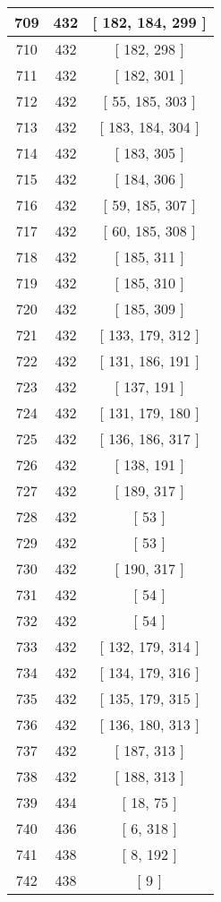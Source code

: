 \begin{center}
\begin{longtable}[H]{|| c c c ||}
\hline
709 & 432 & [ 182, 184, 299 ] \\ 
\hline
710 & 432 & [ 182, 298 ] \\ 
\hline
711 & 432 & [ 182, 301 ] \\ 
\hline
712 & 432 & [ 55, 185, 303 ] \\ 
\hline
713 & 432 & [ 183, 184, 304 ] \\ 
\hline
714 & 432 & [ 183, 305 ] \\ 
\hline
715 & 432 & [ 184, 306 ] \\ 
\hline
716 & 432 & [ 59, 185, 307 ] \\ 
\hline
717 & 432 & [ 60, 185, 308 ] \\ 
\hline
718 & 432 & [ 185, 311 ] \\ 
\hline
719 & 432 & [ 185, 310 ] \\ 
\hline
720 & 432 & [ 185, 309 ] \\ 
\hline
721 & 432 & [ 133, 179, 312 ] \\ 
\hline
722 & 432 & [ 131, 186, 191 ] \\ 
\hline
723 & 432 & [ 137, 191 ] \\ 
\hline
724 & 432 & [ 131, 179, 180 ] \\ 
\hline
725 & 432 & [ 136, 186, 317 ] \\ 
\hline
726 & 432 & [ 138, 191 ] \\ 
\hline
727 & 432 & [ 189, 317 ] \\ 
\hline
728 & 432 & [ 53 ] \\ 
\hline
729 & 432 & [ 53 ] \\ 
\hline
730 & 432 & [ 190, 317 ] \\ 
\hline
731 & 432 & [ 54 ] \\ 
\hline
732 & 432 & [ 54 ] \\ 
\hline
733 & 432 & [ 132, 179, 314 ] \\ 
\hline
734 & 432 & [ 134, 179, 316 ] \\ 
\hline
735 & 432 & [ 135, 179, 315 ] \\ 
\hline
736 & 432 & [ 136, 180, 313 ] \\ 
\hline
737 & 432 & [ 187, 313 ] \\ 
\hline
738 & 432 & [ 188, 313 ] \\ 
\hline
739 & 434 & [ 18, 75 ] \\ 
\hline
740 & 436 & [ 6, 318 ] \\ 
\hline
741 & 438 & [ 8, 192 ] \\ 
\hline
742 & 438 & [ 9 ] \\ 

\end{longtable}
\end{center}
